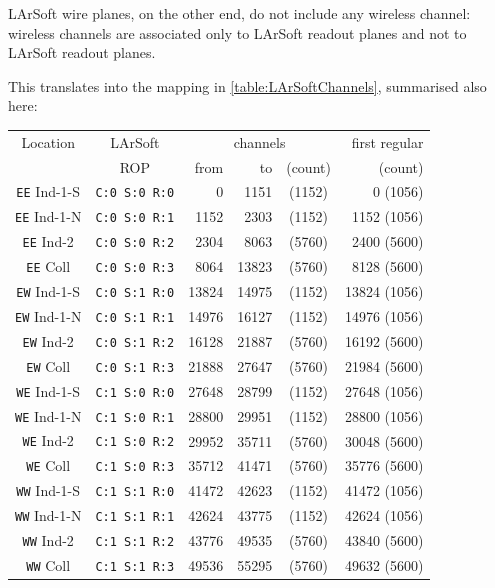 LArSoft wire planes, on the other end, do not include any wireless channel:
wireless channels are associated only to LArSoft readout planes
and not to LArSoft readout planes.

This translates into the mapping in \cref{table:LArSoftChannels}, summarised also here:
\begin{center}
  \begin{tabular}{|cc|rrc|r|}
    \hline
    \hline
    Location            & LArSoft              & \multicolumn{3}{c|}{channels}
                                                                         & first regular \\
                        & ROP                  &  from &    to & (count) &       (count) \\
    \hline
    \texttt{EE} Ind-1-S & \texttt{C:0 S:0 R:0} &     0 &  1151 &  (1152) &      0 (1056) \\
    \texttt{EE} Ind-1-N & \texttt{C:0 S:0 R:1} &  1152 &  2303 &  (1152) &   1152 (1056) \\
    \texttt{EE} Ind-2   & \texttt{C:0 S:0 R:2} &  2304 &  8063 &  (5760) &   2400 (5600) \\
    \texttt{EE} Coll    & \texttt{C:0 S:0 R:3} &  8064 & 13823 &  (5760) &   8128 (5600) \\
    \hline
    \texttt{EW} Ind-1-S & \texttt{C:0 S:1 R:0} & 13824 & 14975 &  (1152) &  13824 (1056) \\
    \texttt{EW} Ind-1-N & \texttt{C:0 S:1 R:1} & 14976 & 16127 &  (1152) &  14976 (1056) \\
    \texttt{EW} Ind-2   & \texttt{C:0 S:1 R:2} & 16128 & 21887 &  (5760) &  16192 (5600) \\
    \texttt{EW} Coll    & \texttt{C:0 S:1 R:3} & 21888 & 27647 &  (5760) &  21984 (5600) \\
    \hline
    \hline
    \texttt{WE} Ind-1-S & \texttt{C:1 S:0 R:0} & 27648 & 28799 &  (1152) &  27648 (1056) \\
    \texttt{WE} Ind-1-N & \texttt{C:1 S:0 R:1} & 28800 & 29951 &  (1152) &  28800 (1056) \\
    \texttt{WE} Ind-2   & \texttt{C:1 S:0 R:2} & 29952 & 35711 &  (5760) &  30048 (5600) \\
    \texttt{WE} Coll    & \texttt{C:1 S:0 R:3} & 35712 & 41471 &  (5760) &  35776 (5600) \\
    \hline
    \texttt{WW} Ind-1-S & \texttt{C:1 S:1 R:0} & 41472 & 42623 &  (1152) &  41472 (1056) \\
    \texttt{WW} Ind-1-N & \texttt{C:1 S:1 R:1} & 42624 & 43775 &  (1152) &  42624 (1056) \\
    \texttt{WW} Ind-2   & \texttt{C:1 S:1 R:2} & 43776 & 49535 &  (5760) &  43840 (5600) \\
    \texttt{WW} Coll    & \texttt{C:1 S:1 R:3} & 49536 & 55295 &  (5760) &  49632 (5600) \\
    \hline
    \hline
  \end{tabular}
  \label{tab:LArSoftChannelsReduced}
\end{center}
